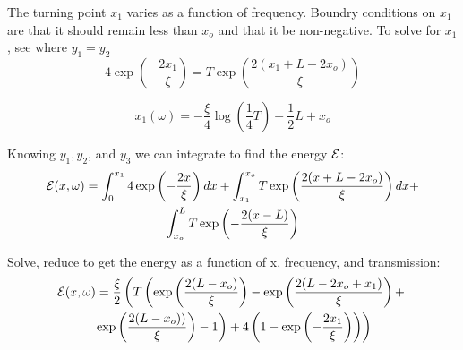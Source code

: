 The turning point $x_1$ varies as a function of frequency. Boundry conditions on $x_1$ are that it should remain less than $x_o$ and that it be non-negative. To solve for $x_1$, see where $y_1=y_2$
\begin{equation}
4 \exp\left(-\frac{2 x_1}{\xi}\right) = T \exp\left(\frac{2(x_1+L-2 x_o)}{\xi}\right)
\end{equation}

\begin{equation}
\boxed{x_1(\omega) = -\frac{\xi}{4} \log(\frac{1}{4} T) - \frac{1}{2}L + x_o}
\end{equation}

Knowing $y_1,y_2$, and $y_3$ we can integrate to find the energy ${\cal E}$:
\begin{equation}
\begin{gathered}
{\cal E}(x,\omega) = \int _0 ^{x_1} 4 \exp\left(-\frac{2 x}{\xi}\right) dx +
    \int _{x_1} ^{x_o} T \exp\left(\frac{2(x+L-2 x_o)}{\xi}\right) dx + \\
    \int _{x_o} ^{L} T \exp\left(-\frac{2(x-L)}{\xi}\right)
\label{fig:Eintegral}
\end{gathered}
\end{equation}

Solve, reduce to get the energy as a function of x, frequency, and transmission:
\begin{equation}
\begin{gathered}
{\cal E}(x,\omega) = \frac{\xi}{2} \left( T \left( \exp\left(\frac{2(L-x_o)}{\xi}\right) - \exp\left(\frac{2(L-2 x_o+x_1)}{\xi}\right)+\right. \right.\\
\left.\left.\exp\left(\frac{2(L-x_o))}{\xi}\right) -1 \right) + 4 \left(1-\exp\left(-\frac{2 x_1}{\xi}\right)\right) \right)
\label{fig:appendixenergy}
\end{gathered}
\end{equation}

